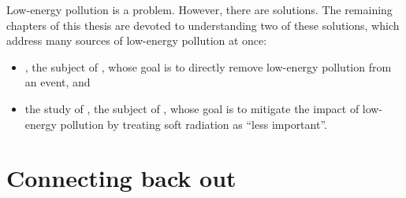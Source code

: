 

Low-energy pollution is a problem.
%
However, there are solutions.
%
The remaining chapters of this thesis are devoted to understanding two of these solutions, which address many sources of low-energy pollution at once:
\begin{itemize}
    \item
        , the subject of , whose goal is to directly remove low-energy pollution from an event, and

    \item
        the study of , the subject of , whose goal is to mitigate the impact of low-energy pollution by treating soft radiation as ``less important''.
\end{itemize}



\section{Connecting back out}




